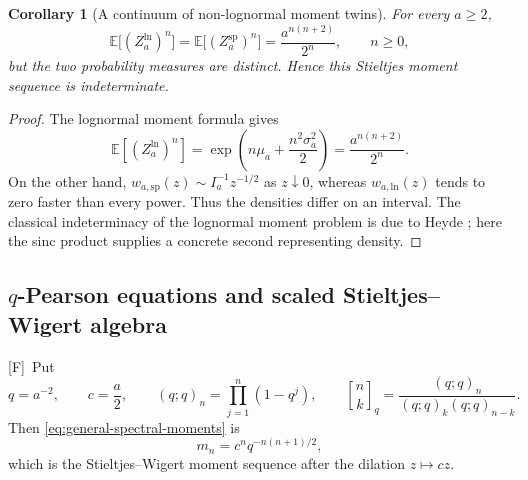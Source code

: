 \documentclass[11pt,oneside]{article}
\newtheorem{corollary}[theorem]{Corollary}
\theoremstyle{definition}
\theoremstyle{remark}
\newcommand{\E}{\mathbb E}
\newcommand{\Fmark}{\textcolor{frontierpurple}{\textsf{[F]}}}
\newcommand{\qbinom}[2]{\genfrac{[}{]}{0pt}{}{#1}{#2}_q}
\begin{document}
\begin{corollary}[A continuum of non-lognormal moment twins]
\label{cor:lognormal-twins}
For every $a\ge2$,
\begin{equation}
 \E\bigl[(Z_a^{\mathrm{ln}})^n\bigr]
 =\E\bigl[(Z_a^{\mathrm{sp}})^n\bigr]
 =\frac{a^{n(n+2)}}{2^n},\qquad n\ge0,
 \label{eq:twin-moments}
\end{equation}
but the two probability measures are distinct.  Hence this Stieltjes moment sequence is
indeterminate.
\end{corollary}

\begin{proof}
The lognormal moment formula gives
\[
 \E[(Z_a^{\mathrm{ln}})^n]
 =\exp\!\left(n\mu_a+\frac{n^2\sigma_a^2}{2}\right)
 =\frac{a^{n(n+2)}}{2^n}.
\]
On the other hand, $w_{a,\mathrm{sp}}(z)\sim I_a^{-1}z^{-1/2}$ as $z\downarrow0$, whereas
$w_{a,\mathrm{ln}}(z)$ tends to zero faster than every power.  Thus the densities differ on an
interval.  The classical indeterminacy of the lognormal moment problem is due to Heyde
\cite{heyde1963}; here the sinc product supplies a concrete second representing density.
\end{proof}

\subsection{$q$-Pearson equations and scaled Stieltjes--Wigert algebra}

\Fmark\ Put
\begin{equation}
 q=a^{-2},\qquad c=\frac a2,
 \qquad (q;q)_n=\prod_{j=1}^{n}(1-q^j),
 \qquad \qbinom{n}{k}=\frac{(q;q)_n}{(q;q)_k(q;q)_{n-k}}.
 \label{eq:spectral-q-notation}
\end{equation}
Then \eqref{eq:general-spectral-moments} is
\begin{equation}
 m_n=c^nq^{-n(n+1)/2},
 \label{eq:scaled-SW-moments}
\end{equation}
which is the Stieltjes--Wigert moment sequence after the dilation $z\mapsto cz$.
\end{document}
